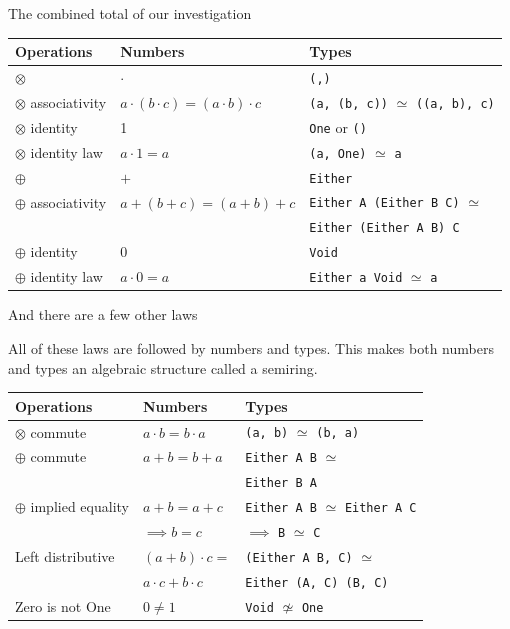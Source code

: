 \documentclass[ignorenonframetext,]{beamer}
\begin{document}
\begin{frame}[fragile]{The combined total of our investigation}

\begin{longtable}[c]{@{}lll@{}}
\toprule
Operations & Numbers & Types\tabularnewline
\midrule
\endhead
\(\otimes\) & \(\cdot\) & \texttt{(,)}\tabularnewline
\(\otimes\) associativity &
\(a \cdot (b \cdot c) = (a \cdot b) \cdot c\) & \texttt{(a,\ (b,\ c))}
\(\simeq\) \texttt{((a,\ b),\ c)}\tabularnewline
\(\otimes\) identity & 1 & \texttt{One} or \texttt{()}\tabularnewline
\(\otimes\) identity law & \(a \cdot 1 = a\) & \texttt{(a,\ One)}
\(\simeq\) \texttt{a}\tabularnewline
\(\oplus\) & \(+\) & \texttt{Either}\tabularnewline
\(\oplus\) associativity & \(a + (b + c) = (a + b) + c\) &
\texttt{Either\ A\ (Either\ B\ C)} \(\simeq\)\tabularnewline
& & \texttt{Either\ (Either\ A\ B)\ C}\tabularnewline
\(\oplus\) identity & 0 & \texttt{Void}\tabularnewline
\(\oplus\) identity law & \(a \cdot 0 = a\) & \texttt{Either\ a\ Void}
\(\simeq\) \texttt{a}\tabularnewline
\bottomrule
\end{longtable}

\end{frame}

\begin{frame}[fragile]{And there are a few other laws}

All of these laws are followed by numbers and types. This makes both
numbers and types an algebraic structure called a semiring.

\begin{longtable}[c]{@{}lll@{}}
\toprule
Operations & Numbers & Types\tabularnewline
\midrule
\endhead
\(\otimes\) commute & \(a \cdot b = b \cdot a\) & \texttt{(a,\ b)}
\(\simeq\) \texttt{(b,\ a)}\tabularnewline
\(\oplus\) commute & \(a + b = b + a\) & \texttt{Either\ A\ B}
\(\simeq\)\tabularnewline
& & \texttt{Either\ B\ A}\tabularnewline
\(\oplus\) implied equality & \(a + b = a + c\) & \texttt{Either\ A\ B}
\(\simeq\) \texttt{Either\ A\ C}\tabularnewline
& \(\implies b = c\) & \(\implies\) \texttt{B} \(\simeq\)
\texttt{C}\tabularnewline
Left distributive & \((a + b) \cdot c =\) & \texttt{(Either\ A\ B,\ C)}
\(\simeq\)\tabularnewline
& \(a \cdot c + b \cdot c\) &
\texttt{Either\ (A,\ C)\ (B,\ C)}\tabularnewline
Zero is not One & \(0 \neq 1\) & \texttt{Void} \(\not\simeq\)
\texttt{One}\tabularnewline
\bottomrule
\end{longtable}

\end{frame}
\end{document}
